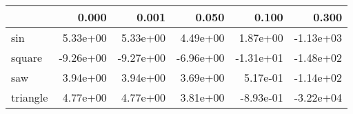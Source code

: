 \begin{tabular}{lrrrrr}
\toprule
{} &     0.000 &     0.001 &     0.050 &     0.100 &     0.300 \\
\midrule
sin      &  5.33e+00 &  5.33e+00 &  4.49e+00 &  1.87e+00 & -1.13e+03 \\
square   & -9.26e+00 & -9.27e+00 & -6.96e+00 & -1.31e+01 & -1.48e+02 \\
saw      &  3.94e+00 &  3.94e+00 &  3.69e+00 &  5.17e-01 & -1.14e+02 \\
triangle &  4.77e+00 &  4.77e+00 &  3.81e+00 & -8.93e-01 & -3.22e+04 \\
\bottomrule
\end{tabular}
